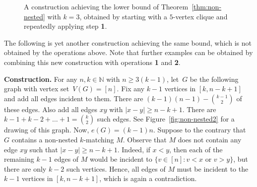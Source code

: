 \documentclass[11pt]{article}
\theoremstyle{definition}
\begin{document}
\begin{figure}[h!]
\centering
{}
\caption{A construction achieving the lower bound of Theorem~\ref{thm:non-nested} with $k=3$, obtained by starting with a $5$-vertex clique and repeatedly applying step {\bf 1}. 
}
\label{fig:non-nested1}
\end{figure}

The following is yet another construction achieving the same bound, which is not obtained by the operations above.
Note that further examples can be obtained by combining this new construction with operations {\bf 1} and {\bf 2}.

\smallskip

{\bf Construction.} For any $n,k\in\mathbb N$ with $n\ge3(k-1)$, let~$G$ be the following graph with vertex set~$V(G)=[n]$.
Fix any $k-1$ vertices in $[k,n-k+1]$ and add all edges incident to them. There are $(k-1)(n-1)-\binom{k-1}{2}$ of these edges.
Also add all edges $xy$ with $|x-y|\ge n-k+1$.
There are $k-1+k-2+\dots+1=\binom{k}{2}$ such edges.
See Figure~\ref{fig:non-nested2} for a drawing of this graph.
Now, $e(G)=(k-1)n$.
Suppose to the contrary that~$G$ contains a non-nested $k$-matching $M$.
Observe that $M$ does not contain any edge $xy$ such that $|x-y|\ge n-k+1$.
Indeed, if $x<y$, then each of the remaining $k-1$ edges of $M$ would be incident to $\{v\in[n]:v<x \text{ or } v>y\}$, but there are only $k-2$ such vertices.
Hence, all edges of $M$ must be incident to the $k-1$ vertices in $[k,n-k+1]$, which is again a contradiction.
\end{document}
